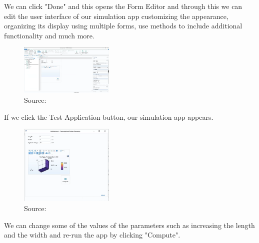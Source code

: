 We can click "Done" and this opens the Form Editor and through this we can edit the user interface of our simulation app customizing the appearance, organizing its display using multiple forms, use methods to include additional functionality and much more.

\begin{figure}[ht!]
  \centering
  \includegraphics[width=0.4\textwidth]{Chapters/Figures/Chapter 3 Figures/Form Editor Desktop.png}
  \caption{Source: \cite{}}
  \label{}
\end{figure}

If we click the Test Application button, our simulation app appears.

\begin{figure}[ht!]
  \centering
  \includegraphics[width=0.4\textwidth]{Chapters/Figures/Chapter 3 Figures/Test Application Results.png}
  \caption{Source: \cite{}}
  \label{}
\end{figure}

We can change some of the values of the parameters such as increasing the length and the width and re-run the app by clicking "Compute".